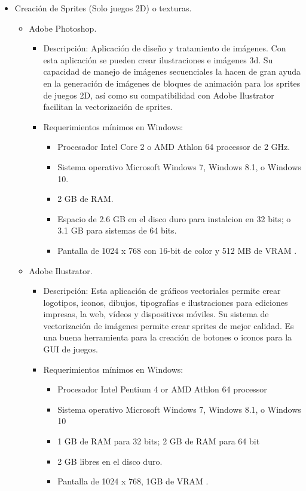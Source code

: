 	\begin{itemize}
		\item Creación de Sprites (Solo juegos 2D) o texturas.
			\begin{itemize}
				\item Adobe Photoshop.
					\begin{itemize}
						\item Descripción: Aplicación de diseño y tratamiento de 
						imágenes. Con esta aplicación se pueden crear ilustraciones e 
						imágenes 3d. Su capacidad de manejo de imágenes secuenciales la 
						hacen de gran ayuda en la generación de imágenes de bloques de 
						animación para los sprites de juegos 2D, así como su 
						compatibilidad con Adobe Ilustrator facilitan la vectorización 
						de sprites.
						\item Requerimientos mínimos en Windows:
						\begin{itemize}
							\item Procesador Intel Core 2 o AMD Athlon 64 processor de 2 
							GHz.
							\item Sistema operativo Microsoft Windows 7, Windows 8.1, o 
							Windows 10.
							\item 2 GB de RAM.
							\item Espacio de 2.6 GB en el disco duro para instalcion en 
							32 bits; o 3.1 GB para sistemas de 64 bits.
							\item Pantalla de 1024 x 768 con 16-bit de color y 512 MB de 
							VRAM \cite{Ref:AdobePhotoshop}.
						\end{itemize}
					\end{itemize}
				\item Adobe Ilustrator.
					\begin{itemize}
						\item Descripción: Esta aplicación de gráficos vectoriales 
						permite crear logotipos, iconos, dibujos, tipografías e 
						ilustraciones para ediciones impresas, la web, vídeos y 
						dispositivos móviles. Su sistema de vectorización de imágenes 
						permite crear sprites de mejor calidad.  Es una buena 
						herramienta para la creación de botones o iconos para la GUI de 
						juegos.
						\item Requerimientos mínimos en Windows:
							\begin{itemize}
								\item Procesador Intel Pentium 4 or AMD Athlon 64 
								processor
								\item Sistema operativo Microsoft Windows 7, Windows 
								8.1, o Windows 10
								\item 1 GB de RAM para 32 bits; 2 GB de RAM para 64 bit
								\item 2 GB libres en el disco duro.
								\item Pantalla de 1024 x 768, 1GB de VRAM
								\cite{Ref:AdobeIlustrator}.
							\end{itemize}


\end{itemize}
\end{itemize}
\end{itemize}
